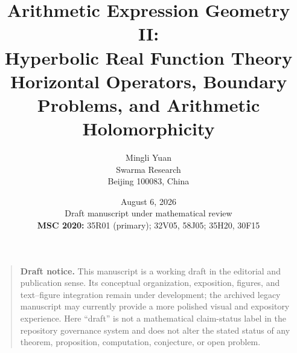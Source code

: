 \documentclass[11pt]{article}
\title{\textbf{Arithmetic Expression Geometry II:\\Hyperbolic Real Function Theory}\\[0.45em]
\large Horizontal Operators, Boundary Problems, and Arithmetic Holomorphicity}
\author{
Mingli Yuan\\
Swarma Research\\
Beijing 100083, China
}
\date{August 6, 2026\\[0.25em]
\small Draft manuscript under mathematical review\\[0.35em]
\small
\textbf{MSC 2020:} 35R01 (primary); 32V05, 58J05;
35H20, 30F15}
\theoremstyle{definition}
\theoremstyle{remark}
\begin{document}
\maketitle

\begin{quote}\small
\textbf{Draft notice.}
This manuscript is a working draft in the editorial and publication sense.  Its
conceptual organization, exposition, figures, and text--figure integration remain
under development; the archived legacy manuscript may currently provide a more
polished visual and expository experience.  Here ``draft'' is not a mathematical
claim-status label in the repository governance system and does not alter the stated
status of any theorem, proposition, computation, conjecture, or open problem.
\end{quote}
\end{document}
